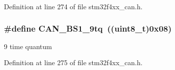 Definition at line 274 of file stm32f4xx\-\_\-can.\-h.

\hypertarget{group___c_a_n__time__quantum__in__bit__segment__1_ga0493701bdd73a9649510f035439a6580}{
\subsubsection[{C\-A\-N\-\_\-\-B\-S1\-\_\-9tq}]{\setlength{\rightskip}{0pt plus 5cm}\#define C\-A\-N\-\_\-\-B\-S1\-\_\-9tq~((uint8\-\_\-t)0x08)}}\label{group___c_a_n__time__quantum__in__bit__segment__1_ga0493701bdd73a9649510f035439a6580}
9 time quantum 

Definition at line 275 of file stm32f4xx\-\_\-can.\-h.

